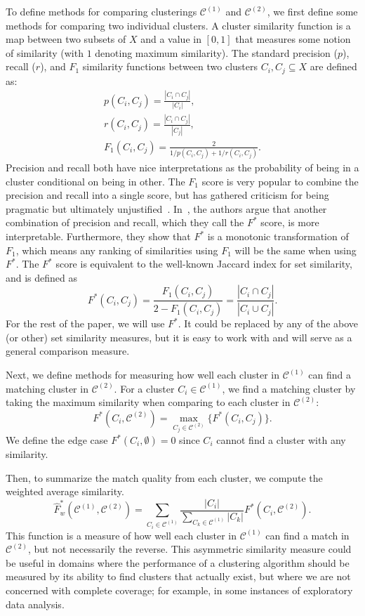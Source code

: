 \documentclass[11pt]{article}
\theoremstyle{remark}
\newcommand\cCone{\mathcal{C}^{(1)}}
\newcommand\cCtwo{\mathcal{C}^{(2)}}
\begin{document}
To define methods for comparing clusterings $\cCone$ and $\cCtwo$, we first define some methods for comparing two individual clusters.
A cluster similarity function is a map between two subsets of $X$ and a value in $[0,1]$ that measures some notion of similarity (with $1$ denoting maximum similarity).
The standard precision ($p$), recall ($r$), and $F_1$ similarity functions between two clusters $C_i, C_j \subseteq X$ are defined as:
\begin{gather*}
    p(C_i, C_j) = \frac{|C_i \cap C_j|}{|C_i|},\\
    r(C_i, C_j) = \frac{|C_i \cap C_j|}{|C_j|},\\
    F_1(C_i, C_j) = \frac{2}{1 / p(C_i, C_j) + 1 / r(C_i, C_j)}.
\end{gather*}
Precision and recall both have nice interpretations as the probability of being in a cluster conditional on being in other.
The $F_1$ score is very popular to combine the precision and recall into a single score, but has gathered criticism for being pragmatic but ultimately unjustified~\cite{F-review}.
In~\cite{F*}, the authors argue that another combination of precision and recall, which they call the $F^*$ score, is more interpretable.
Furthermore, they show that $F^*$ is a monotonic transformation of $F_1$, which means any ranking of similarities using $F_1$ will be the same when using $F^*$.
The $F^*$ score is equivalent to the well-known Jaccard index for set similarity, and is defined as
\begin{equation*}
F^*(C_i, C_j) = \frac{F_1(C_i, C_j)}{2 - F_1(C_i, C_j)} = \frac{|C_i \cap C_j|}{|C_i \cup C_j|}.
\end{equation*}
For the rest of the paper, we will use $F^*$.
It could be replaced by any of the above (or other) set similarity measures, but it is easy to work with and will serve as a general comparison measure.

Next, we define methods for measuring how well each cluster in $\cCone$ can find a matching cluster in $\cCtwo$.
For a cluster $C_i \in \cCone$, we find a matching cluster by taking the maximum similarity when comparing to each cluster in $\cCtwo$:
\begin{equation*}
    F^*(C_i, \cCtwo) = \max_{C_j \in \cCtwo} \big\{ F^*(C_i, C_j) \big\}.
\end{equation*}
We define the edge case $F^*(C_i, \emptyset) = 0$ since $C_i$ cannot find a cluster with any similarity.

Then, to summarize the match quality from each cluster, we compute the weighted average similarity.
\begin{equation*}
    \hat{F}^{*}_w(\cCone, \cCtwo) = \sum_{C_i \in \cCone} \frac{|C_i|}{\sum_{C_k \in \cCone} |C_k|} F^*(C_i, \cCtwo).
\end{equation*}
This function is a measure of how well each cluster in $\cCone$ can find a match in $\cCtwo$, but not necessarily the reverse.
This asymmetric similarity measure could be useful in domains where the performance of a clustering algorithm should be measured by its ability to find clusters that actually exist, but where we are not concerned with complete coverage; for example, in some instances of exploratory data analysis.
\end{document}
